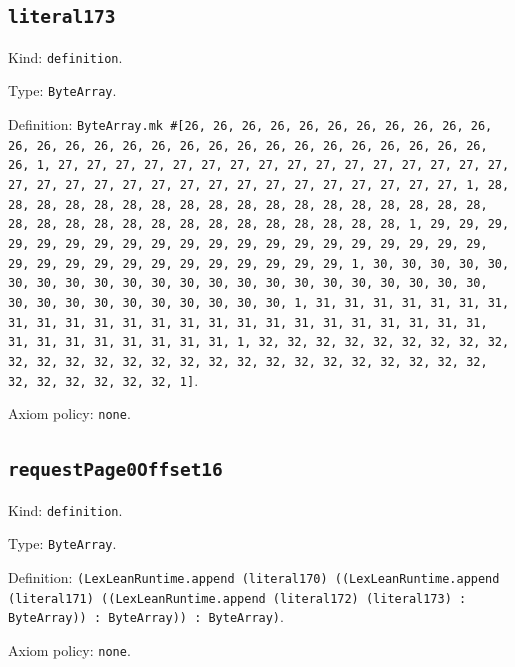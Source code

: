 \documentclass[11pt]{article}
\begin{document}
\subsection*{\texttt{literal173}}
\noindent Kind: \texttt{definition}.\par
\noindent Type: \texttt{ByteArray}.\par
\noindent Definition: \texttt{ByteArray.mk \#[26, 26, 26, 26, 26, 26, 26, 26, 26, 26, 26, 26, 26, 26, 26, 26, 26, 26, 26, 26, 26, 26, 26, 26, 26, 26, 26, 26, 26, 1, 27, 27, 27, 27, 27, 27, 27, 27, 27, 27, 27, 27, 27, 27, 27, 27, 27, 27, 27, 27, 27, 27, 27, 27, 27, 27, 27, 27, 27, 27, 27, 27, 1, 28, 28, 28, 28, 28, 28, 28, 28, 28, 28, 28, 28, 28, 28, 28, 28, 28, 28, 28, 28, 28, 28, 28, 28, 28, 28, 28, 28, 28, 28, 28, 28, 1, 29, 29, 29, 29, 29, 29, 29, 29, 29, 29, 29, 29, 29, 29, 29, 29, 29, 29, 29, 29, 29, 29, 29, 29, 29, 29, 29, 29, 29, 29, 29, 29, 1, 30, 30, 30, 30, 30, 30, 30, 30, 30, 30, 30, 30, 30, 30, 30, 30, 30, 30, 30, 30, 30, 30, 30, 30, 30, 30, 30, 30, 30, 30, 30, 30, 1, 31, 31, 31, 31, 31, 31, 31, 31, 31, 31, 31, 31, 31, 31, 31, 31, 31, 31, 31, 31, 31, 31, 31, 31, 31, 31, 31, 31, 31, 31, 31, 31, 1, 32, 32, 32, 32, 32, 32, 32, 32, 32, 32, 32, 32, 32, 32, 32, 32, 32, 32, 32, 32, 32, 32, 32, 32, 32, 32, 32, 32, 32, 32, 32, 32, 1]}.\par
\noindent Axiom policy: \texttt{none}.\par
\subsection*{\texttt{requestPage0Offset16}}
\noindent Kind: \texttt{definition}.\par
\noindent Type: \texttt{ByteArray}.\par
\noindent Definition: \texttt{(LexLeanRuntime.append (literal170) ((LexLeanRuntime.append (literal171) ((LexLeanRuntime.append (literal172) (literal173) : ByteArray)) : ByteArray)) : ByteArray)}.\par
\noindent Axiom policy: \texttt{none}.\par
\end{document}
